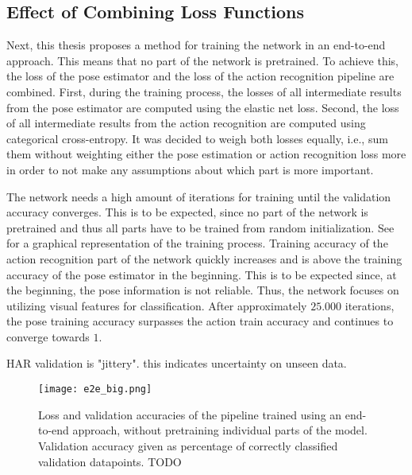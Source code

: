 
\subsection{Effect of Combining Loss Functions}
Next, this thesis proposes a method for training the network in an end-to-end approach.
This means that no part of the network is pretrained.
To achieve this, the loss of the pose estimator and the loss of the action recognition pipeline are combined.
First, during the training process, the losses of all intermediate results from the pose estimator are computed using the elastic net loss.
Second, the loss of all intermediate results from the action recognition are computed using categorical cross-entropy.
It was decided to weigh both losses equally, i.e., sum them without weighting either the pose estimation or action recognition loss more in order to not make any assumptions about which part is more important.

The network needs a high amount of iterations for training until the validation accuracy converges.
This is to be expected, since no part of the network is pretrained and thus all parts have to be trained from random initialization.
See  for a graphical representation of the training process.
Training accuracy of the action recognition part of the network quickly increases and is above the training accuracy of the pose estimator in the beginning.  
This is to be expected since, at the beginning, the pose information is not reliable.
Thus, the network focuses on utilizing visual features for classification.
After approximately $25.000$ iterations, the pose training accuracy surpasses the action train accuracy and continues to converge towards $1$.

HAR validation is "jittery". this indicates uncertainty on unseen data. 


\begin{figure}[htb!]
    \centering
    \texttt{[image: e2e\_big.png]}
    \caption{Loss and validation accuracies of the pipeline trained using an end-to-end approach, without pretraining individual parts of the model. Validation accuracy given as percentage of correctly classified validation datapoints. TODO}
    \label{fig:e2e_big}
\end{figure}


